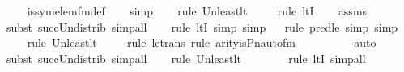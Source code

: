 \begin{isabellebody}
\ \ \isamarkupfalse%
\ is{\isacharunderscore}{\kern0pt}sym{\isacharunderscore}{\kern0pt}elem{\isacharunderscore}{\kern0pt}fm{\isacharunderscore}{\kern0pt}def\isanewline
\ \ \isamarkupfalse%
\ simp\ \isanewline
\ \ \isamarkupfalse%
{\isacharparenleft}{\kern0pt}rule\ Un{\isacharunderscore}{\kern0pt}least{\isacharunderscore}{\kern0pt}lt{\isacharparenright}{\kern0pt}{\isacharplus}{\kern0pt}\isanewline
\ \ \ \ \isamarkupfalse%
{\isacharparenleft}{\kern0pt}rule\ ltI{\isacharparenright}{\kern0pt}\isanewline
\ \ \isamarkupfalse%
\ assms\isanewline
\ \ \ \ \ \isamarkupfalse%
{\isacharparenleft}{\kern0pt}subst\ succ{\isacharunderscore}{\kern0pt}Un{\isacharunderscore}{\kern0pt}distrib{\isacharcomma}{\kern0pt}\ simp{\isacharunderscore}{\kern0pt}all{\isacharparenright}{\kern0pt}{\isacharplus}{\kern0pt}\isanewline
\ \ \ \isamarkupfalse%
{\isacharparenleft}{\kern0pt}rule\ ltI{\isacharcomma}{\kern0pt}\ simp{\isacharcomma}{\kern0pt}\ simp{\isacharparenright}{\kern0pt}\isanewline
\ \ \isamarkupfalse%
{\isacharparenleft}{\kern0pt}rule\ pred{\isacharunderscore}{\kern0pt}le{\isacharcomma}{\kern0pt}\ simp{\isacharcomma}{\kern0pt}\ simp{\isacharparenright}{\kern0pt}\isanewline
\ \ \ \isamarkupfalse%
{\isacharparenleft}{\kern0pt}rule\ Un{\isacharunderscore}{\kern0pt}least{\isacharunderscore}{\kern0pt}lt{\isacharparenright}{\kern0pt}{\isacharplus}{\kern0pt}\isanewline
\ \ \ \ \isamarkupfalse%
{\isacharparenleft}{\kern0pt}rule\ le{\isacharunderscore}{\kern0pt}trans{\isacharcomma}{\kern0pt}\ rule\ arity{\isacharunderscore}{\kern0pt}is{\isacharunderscore}{\kern0pt}Pn{\isacharunderscore}{\kern0pt}auto{\isacharunderscore}{\kern0pt}fm{\isacharparenright}{\kern0pt}\isanewline
\ \ \ \ \ \ \ \ \isamarkupfalse%
\ auto{\isacharbrackleft}{\kern0pt}{}{\isacharbrackright}{\kern0pt}\isanewline
\ \ \ \ \isamarkupfalse%
{\isacharparenleft}{\kern0pt}subst\ succ{\isacharunderscore}{\kern0pt}Un{\isacharunderscore}{\kern0pt}distrib{\isacharcomma}{\kern0pt}\ simp{\isacharunderscore}{\kern0pt}all{\isacharparenright}{\kern0pt}{\isacharplus}{\kern0pt}\isanewline
\ \ \ \isamarkupfalse%
{\isacharparenleft}{\kern0pt}rule\ Un{\isacharunderscore}{\kern0pt}least{\isacharunderscore}{\kern0pt}lt{\isacharparenright}{\kern0pt}{\isacharplus}{\kern0pt}\isanewline
\ \ \ \ \ \ \ \isamarkupfalse%
{\isacharparenleft}{\kern0pt}rule\ ltI{\isacharcomma}{\kern0pt}\ simp{\isacharunderscore}{\kern0pt}all{\isacharparenright}{\kern0pt}{\isacharplus}{\kern0pt}\isanewline

\end{isabellebody}

